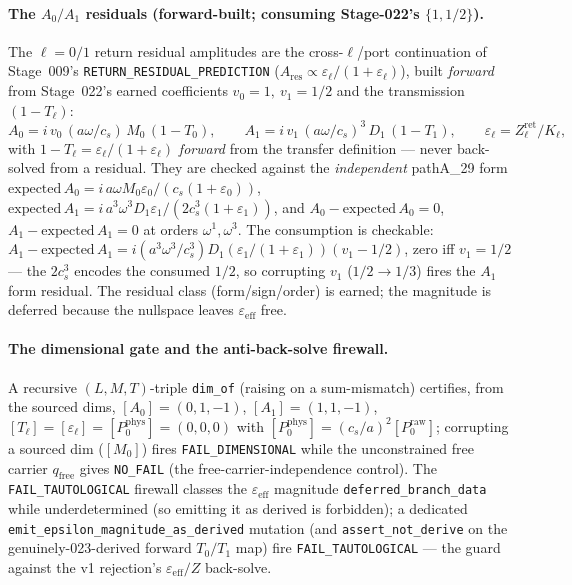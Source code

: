 \paragraph{The \texorpdfstring{\(A_0/A_1\)}{A0/A1} residuals (forward-built; consuming Stage-022's \texorpdfstring{\(\{1,1/2\}\)}{{1,1/2}}).}
The \(\ell=0/1\) return residual amplitudes are the cross-\(\ell\)/port continuation of Stage~009's
\texttt{RETURN\_RESIDUAL\_PREDICTION} (\(A_{\mathrm{res}}\propto\varepsilon_\ell/(1+\varepsilon_\ell)\)), built \emph{forward}
from Stage~022's earned coefficients \(v_0=1,\ v_1=1/2\) and the transmission \((1-T_\ell)\):
\[
A_0=i\,v_0\,(a\omega/c_s)\,M_0\,(1-T_0),\qquad A_1=i\,v_1\,(a\omega/c_s)^3\,D_1\,(1-T_1),\qquad \varepsilon_\ell=Z_\ell^{\mathrm{ret}}/K_\ell,
\]
with \(1-T_\ell=\varepsilon_\ell/(1+\varepsilon_\ell)\) \emph{forward} from the transfer definition --- never back-solved from a
residual. They are checked against the \emph{independent} pathA\_29 form
\(\mathrm{expected}\,A_0=i\,a\omega M_0\varepsilon_0/(c_s(1+\varepsilon_0))\),
\(\mathrm{expected}\,A_1=i\,a^3\omega^3 D_1\varepsilon_1/(2c_s^3(1+\varepsilon_1))\), and \(A_0-\mathrm{expected}\,A_0=0\),
\(A_1-\mathrm{expected}\,A_1=0\) at orders \(\omega^1,\omega^3\). The consumption is checkable:
\(A_1-\mathrm{expected}\,A_1=i(a^3\omega^3/c_s^3)D_1(\varepsilon_1/(1+\varepsilon_1))(v_1-1/2)\), zero iff \(v_1=1/2\) --- the
\(2c_s^3\) encodes the consumed \(1/2\), so corrupting \(v_1\) (\(1/2\to1/3\)) fires the \(A_1\) form residual. The residual class
(form/sign/order) is earned; the magnitude is deferred because the nullspace leaves \(\varepsilon_{\mathrm{eff}}\) free.

\paragraph{The dimensional gate and the anti-back-solve firewall.}
A recursive \((L,M,T)\)-triple \texttt{dim\_of} (raising on a sum-mismatch) certifies, from the sourced dims, \([A_0]=(0,1,-1)\),
\([A_1]=(1,1,-1)\), \([T_\ell]=[\varepsilon_\ell]=[P_0^{\mathrm{phys}}]=(0,0,0)\) with \([P_0^{\mathrm{phys}}]=(c_s/a)^2[P_0^{\mathrm{raw}}]\);
corrupting a sourced dim (\([M_0]\)) fires \texttt{FAIL\_DIMENSIONAL} while the unconstrained free carrier \(q_{\mathrm{free}}\)
gives \texttt{NO\_FAIL} (the free-carrier-independence control). The \texttt{FAIL\_TAUTOLOGICAL} firewall classes the
\(\varepsilon_{\mathrm{eff}}\) magnitude \texttt{deferred\_branch\_data} while underdetermined (so emitting it as derived is
forbidden); a dedicated \texttt{emit\_epsilon\_magnitude\_as\_derived} mutation (and \texttt{assert\_not\_derive} on the
genuinely-023-derived forward \(T_0/T_1\) map) fire \texttt{FAIL\_TAUTOLOGICAL} --- the guard against the v1 rejection's
\(\varepsilon_{\mathrm{eff}}/Z\) back-solve.

